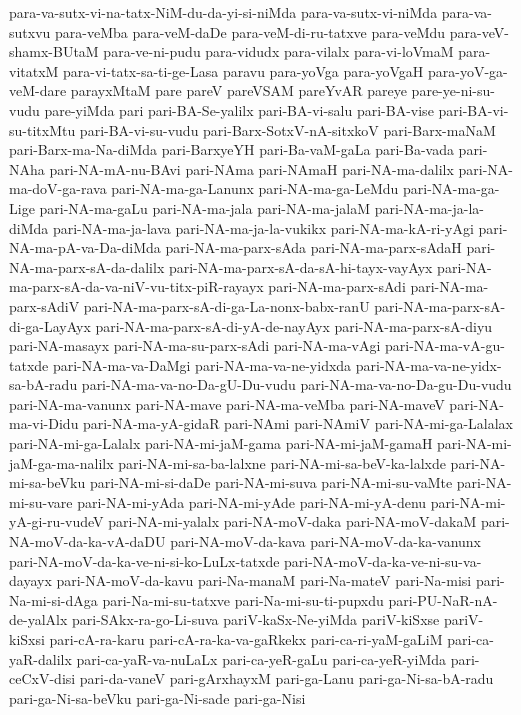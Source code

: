 {para-va-sutx-vi-na-tatx-NiM-du-da-yi-si-niMda
para-va-sutx-vi-niMda
para-va-sutxvu
para-veMba
para-veM-daDe
para-veM-di-ru-tatxve
para-veMdu
para-veV-shamx-BUtaM
para-ve-ni-pudu
para-vidudx
para-vilalx
para-vi-loVmaM
para-vitatxM
para-vi-tatx-sa-ti-ge-Lasa
paravu
para-yoVga
para-yoVgaH
para-yoV-ga-veM-dare
parayxMtaM
pare
pareV
pareVSAM
pareYvAR
pareye
pare-ye-ni-su-vudu
pare-yiMda
pari
pari-BA-Se-yalilx
pari-BA-vi-salu
pari-BA-vise
pari-BA-vi-su-titxMtu
pari-BA-vi-su-vudu
pari-Barx-SotxV-nA-sitxkoV
pari-Barx-maNaM
pari-Barx-ma-Na-diMda
pari-BarxyeYH
pari-Ba-vaM-gaLa
pari-Ba-vada
pari-NAha
pari-NA-mA-nu-BAvi
pari-NAma
pari-NAmaH
pari-NA-ma-dalilx
pari-NA-ma-doV-ga-rava
pari-NA-ma-ga-Lanunx
pari-NA-ma-ga-LeMdu
pari-NA-ma-ga-Lige
pari-NA-ma-gaLu
pari-NA-ma-jala
pari-NA-ma-jalaM
pari-NA-ma-ja-la-diMda
pari-NA-ma-ja-lava
pari-NA-ma-ja-la-vukikx
pari-NA-ma-kA-ri-yAgi
pari-NA-ma-pA-va-Da-diMda
pari-NA-ma-parx-sAda
pari-NA-ma-parx-sAdaH
pari-NA-ma-parx-sA-da-dalilx
pari-NA-ma-parx-sA-da-sA-hi-tayx-vayAyx
pari-NA-ma-parx-sA-da-va-niV-vu-titx-piR-rayayx
pari-NA-ma-parx-sAdi
pari-NA-ma-parx-sAdiV
pari-NA-ma-parx-sA-di-ga-La-nonx-babx-ranU
pari-NA-ma-parx-sA-di-ga-LayAyx
pari-NA-ma-parx-sA-di-yA-de-nayAyx
pari-NA-ma-parx-sA-diyu
pari-NA-masayx
pari-NA-ma-su-parx-sAdi
pari-NA-ma-vAgi
pari-NA-ma-vA-gu-tatxde
pari-NA-ma-va-DaMgi
pari-NA-ma-va-ne-yidxda
pari-NA-ma-va-ne-yidx-sa-bA-radu
pari-NA-ma-va-no-Da-gU-Du-vudu
pari-NA-ma-va-no-Da-gu-Du-vudu
pari-NA-ma-vanunx
pari-NA-mave
pari-NA-ma-veMba
pari-NA-maveV
pari-NA-ma-vi-Didu
pari-NA-ma-yA-gidaR
pari-NAmi
pari-NAmiV
pari-NA-mi-ga-Lalalax
pari-NA-mi-ga-Lalalx
pari-NA-mi-jaM-gama
pari-NA-mi-jaM-gamaH
pari-NA-mi-jaM-ga-ma-nalilx
pari-NA-mi-sa-ba-lalxne
pari-NA-mi-sa-beV-ka-lalxde
pari-NA-mi-sa-beVku
pari-NA-mi-si-daDe
pari-NA-mi-suva
pari-NA-mi-su-vaMte
pari-NA-mi-su-vare
pari-NA-mi-yAda
pari-NA-mi-yAde
pari-NA-mi-yA-denu
pari-NA-mi-yA-gi-ru-vudeV
pari-NA-mi-yalalx
pari-NA-moV-daka
pari-NA-moV-dakaM
pari-NA-moV-da-ka-vA-daDU
pari-NA-moV-da-kava
pari-NA-moV-da-ka-vanunx
pari-NA-moV-da-ka-ve-ni-si-ko-LuLx-tatxde
pari-NA-moV-da-ka-ve-ni-su-va-dayayx
pari-NA-moV-da-kavu
pari-Na-manaM
pari-Na-mateV
pari-Na-misi
pari-Na-mi-si-dAga
pari-Na-mi-su-tatxve
pari-Na-mi-su-ti-pupxdu
pari-PU-NaR-nA-de-yalAlx
pari-SAkx-ra-go-Li-suva
pariV-kaSx-Ne-yiMda
pariV-kiSxse
pariV-kiSxsi
pari-cA-ra-karu
pari-cA-ra-ka-va-gaRkekx
pari-ca-ri-yaM-gaLiM
pari-ca-yaR-dalilx
pari-ca-yaR-va-nuLaLx
pari-ca-yeR-gaLu
pari-ca-yeR-yiMda
pari-ceCxV-disi
pari-da-vaneV
pari-gArxhayxM
pari-ga-Lanu
pari-ga-Ni-sa-bA-radu
pari-ga-Ni-sa-beVku
pari-ga-Ni-sade
pari-ga-Nisi
}
